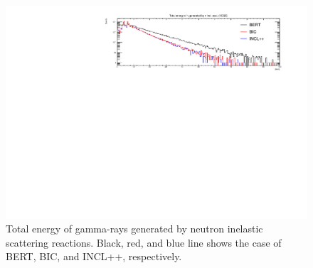\begin{figure}[p]
	\centering
	\includegraphics[width=16cm]{PDF/Secondary/Comparison/onlyNCQE_gamma/pdf1/Logy_TotEneSec}
	\caption[Total energy of gamma-rays generated by neutron inelastic scattering reactions]{
	Total energy of gamma-rays generated by neutron inelastic scattering reactions.
	Black, red, and blue line shows the case of BERT, BIC, and INCL++, respectively.
	}\label{gamma_Logy_TotEneSec}
\end{figure}


